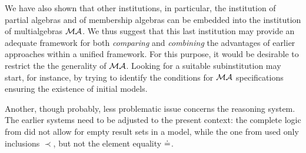 \documentclass[10pt]{article}
\begin{document}
We have also shown that other institutions, in particular, the institution of
partial algebras and of membership algebras can be embedded into the
institution of multialgebras ${\mathcal{MA}}$. We thus suggest that this last institution may
provide an adequate framework for both {\em comparing} and {\em combining} the advantages
of earlier approaches within a unified framework.
For this purpose, it would be desirable to restrict the 
the generality of ${\mathcal{MA}}$. Looking for a suitable subinstitution may
start, for instance, by trying to identify the conditions for ${\mathcal{MA}}$
specifications ensuring the existence of initial models. 

Another, though probably, less problematic issue concerns the reasoning
system. The earlier systems need to be adjusted to the present context: the
complete logic from \cite{toplas,calc} did not allow for empty result sets in a model,
while the one from \cite{BK} used only inclusions $\prec$, but not the element
equality $\mathrel{\dot{=} }$.





\end{document}
